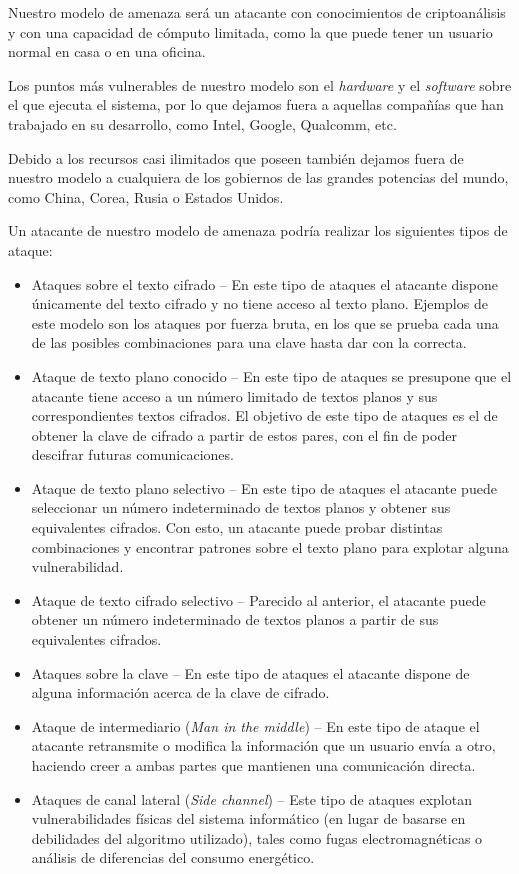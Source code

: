 Nuestro modelo de amenaza será un atacante con conocimientos de criptoanálisis y con una capacidad de cómputo limitada, como la que puede tener un usuario normal en casa o en una oficina.

Los puntos más vulnerables de nuestro modelo son el \emph{hardware} y el \emph{software} sobre el que ejecuta el sistema, por lo que dejamos fuera a aquellas compañías que han trabajado en su desarrollo, como Intel, Google, Qualcomm, etc.

Debido a los recursos casi ilimitados que poseen también dejamos fuera de nuestro modelo a cualquiera de los gobiernos de las grandes potencias del mundo, como China, Corea, Rusia o Estados Unidos.

Un atacante de nuestro modelo de amenaza podría realizar los siguientes tipos de ataque:

\begin{itemize}
  \item Ataques sobre el texto cifrado -- En este tipo de ataques el atacante dispone únicamente del texto cifrado y no tiene acceso al texto plano. Ejemplos de este modelo son los ataques por fuerza bruta, en los que se prueba cada una de las posibles combinaciones para una clave hasta dar con la correcta.

  \item Ataque de texto plano conocido -- En este tipo de ataques se presupone que el atacante tiene acceso a un número limitado de textos planos y sus correspondientes textos cifrados. El objetivo de este tipo de ataques es el de obtener la clave de cifrado a partir de estos pares, con el fin de poder descifrar futuras comunicaciones.

  \item Ataque de texto plano selectivo -- En este tipo de ataques el atacante puede seleccionar un número indeterminado de textos planos y obtener sus equivalentes cifrados. Con esto, un atacante puede probar distintas combinaciones y encontrar patrones sobre el texto plano para explotar alguna vulnerabilidad.

  \item Ataque de texto cifrado selectivo -- Parecido al anterior, el atacante puede obtener un número indeterminado de textos planos a partir de sus equivalentes cifrados.

  \item Ataques sobre la clave -- En este tipo de ataques el atacante dispone de alguna información acerca de la clave de cifrado.

  \item Ataque de intermediario (\emph{Man in the middle}) -- En este tipo de ataque el atacante retransmite o modifica la información que un usuario envía a otro, haciendo creer a ambas partes que mantienen una comunicación directa.

  \item Ataques de canal lateral (\emph{Side channel}) -- Este tipo de ataques explotan vulnerabilidades físicas del sistema informático (en lugar de basarse en debilidades del algoritmo utilizado), tales como fugas electromagnéticas o análisis de diferencias del consumo energético.
\end{itemize} \emph{\parencite{Reference20}}\\
